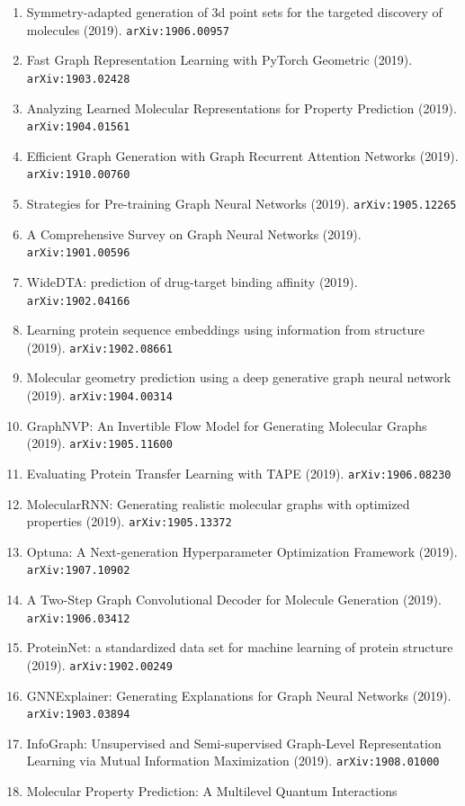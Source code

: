 \documentclass[11pt]{article}
\begin{document}
\begin{enumerate}
  \item Symmetry-adapted generation of 3d point sets for the targeted discovery
  of molecules (2019). \texttt{arXiv:1906.00957}
  \item Fast Graph Representation Learning with PyTorch Geometric (2019). \texttt{arXiv:1903.02428}
  \item Analyzing Learned Molecular Representations for Property Prediction (2019). \texttt{arXiv:1904.01561}
  \item Efficient Graph Generation with Graph Recurrent Attention Networks (2019). \texttt{arXiv:1910.00760}
  \item Strategies for Pre-training Graph Neural Networks (2019). \texttt{arXiv:1905.12265}
  \item A Comprehensive Survey on Graph Neural Networks (2019). \texttt{arXiv:1901.00596}
  \item WideDTA: prediction of drug-target binding affinity (2019). \texttt{arXiv:1902.04166}
  \item Learning protein sequence embeddings using information from structure (2019). \texttt{arXiv:1902.08661}
  \item Molecular geometry prediction using a deep generative graph neural
  network (2019). \texttt{arXiv:1904.00314}
  \item GraphNVP: An Invertible Flow Model for Generating Molecular Graphs (2019). \texttt{arXiv:1905.11600}
  \item Evaluating Protein Transfer Learning with TAPE (2019). \texttt{arXiv:1906.08230}
  \item MolecularRNN: Generating realistic molecular graphs with optimized
  properties (2019). \texttt{arXiv:1905.13372}
  \item Optuna: A Next-generation Hyperparameter Optimization Framework (2019). \texttt{arXiv:1907.10902}
  \item A Two-Step Graph Convolutional Decoder for Molecule Generation (2019). \texttt{arXiv:1906.03412}
  \item ProteinNet: a standardized data set for machine learning of protein
  structure (2019). \texttt{arXiv:1902.00249}
  \item GNNExplainer: Generating Explanations for Graph Neural Networks (2019). \texttt{arXiv:1903.03894}
  \item InfoGraph: Unsupervised and Semi-supervised Graph-Level Representation
  Learning via Mutual Information Maximization (2019). \texttt{arXiv:1908.01000}
  \item Molecular Property Prediction: A Multilevel Quantum Interactions

\end{enumerate}
\end{document}
